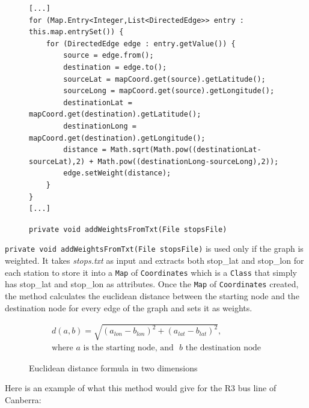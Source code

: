 \documentclass{article}
\begin{document}
\begin{figure}[h]
\begin{verbatim}
[...]
for (Map.Entry<Integer,List<DirectedEdge>> entry : this.map.entrySet()) {
	for (DirectedEdge edge : entry.getValue()) {
		source = edge.from();
		destination = edge.to();
		sourceLat = mapCoord.get(source).getLatitude();
		sourceLong = mapCoord.get(source).getLongitude();
		destinationLat = mapCoord.get(destination).getLatitude();
		destinationLong = mapCoord.get(destination).getLongitude();
		distance = Math.sqrt(Math.pow((destinationLat-sourceLat),2) + Math.pow((destinationLong-sourceLong),2));
		edge.setWeight(distance);
	}
}
[...]
\end{verbatim}
\caption{\texttt{private void addWeightsFromTxt(File stopsFile)}}
\end{figure}

\texttt{private void addWeightsFromTxt(File stopsFile)} is used only if the graph is weighted. It takes \textit{stops.txt} as input and extracts both stop\_lat and stop\_lon for each station to store it into a \texttt{Map} of \texttt{Coordinates} which is a \texttt{Class} that simply has stop\_lat and stop\_lon as attributes. Once the \texttt{Map} of \texttt{Coordinates} created, the method calculates the euclidean distance between the starting node and the destination node for every edge of the graph and sets it as weights.

\begin{figure}[h]
\begin{gather*}
  d(a,b) = \sqrt{(a_{lon} - b_{lon})^2 + (a_{lat} - b_{lat})^2}, \\
  \text{where~$a$ is the starting node, and ~$b$ the destination node}
\end{gather*}
\caption{Euclidean distance formula in two dimensions}
\end{figure}

Here is an example of what this method would give for the R3 bus line of Canberra:
\end{document}
